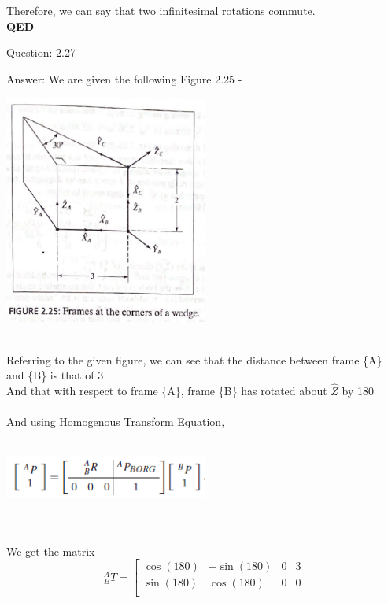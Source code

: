 \documentclass[a4paper]{article}
\begin{document}
\begin{qalist}
			Therefore, we can say that two infinitesimal rotations commute.\\
			\textbf{QED} 
			\newpage

		\item[Question: 2.27] \setcounter{equation}{0}
		\item[Answer:]
			We are given the following Figure 2.25 - \\
			\begin{minipage}{\linewidth}
					\centering
					\includegraphics[width=0.5\textwidth]{fig225.png}
			\end{minipage}
			\\
			Referring to the given figure, we can see that the distance between frame \{A\} and \{B\} is that of 3\\
			And that with respect to frame \{A\}, frame \{B\} has rotated about \(\hat{Z}\) by 180\degree \\ \\
			And using Homogenous Transform Equation, \\ \\
			\begin{minipage}{\linewidth}
					\centering
					\includegraphics[width=0.5\textwidth]{HT.png}
			\end{minipage}
			\\ \\
			We get the matrix
			\begin{equation}
				{}^{A}_{B}{T} = 
				\left[ \begin{matrix}
					\cos(180) & -\sin(180) & 0 & 3 \\
					\sin(180) & \cos(180) & 0 & 0 \\

\end{matrix}
\end{equation}
\end{qalist}
\end{document}
